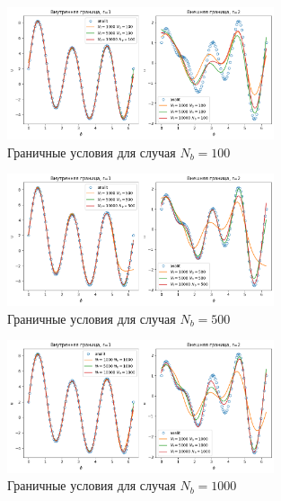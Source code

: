 \documentclass[a4paper,14pt]{extarticle} %
\begin{document}
\begin{figure}[ht]
    \center
    \includegraphics[width=0.7\textwidth]{../plots/termal/bnd l = (20x4) Nf=[1000, 5000, 10000] Nu=100.png}
    \caption{Граничные условия для случая $N_b=100$}
    \label{fig:termal_bnd1}
\end{figure}
\begin{figure}[ht]
    \center
    \includegraphics[width=0.7\textwidth]{../plots/termal/bnd l = (20x4) Nf=[1000, 5000, 10000] Nu=500.png}
    \caption{Граничные условия для случая $N_b=500$}
    \label{fig:termal_bnd2}
\end{figure}
\begin{figure}[ht]
    \center
    \includegraphics[width=0.7\textwidth]{../plots/termal/bnd l = (20x4) Nf=[1000, 5000, 10000] Nu=1000.png}
    \caption{Граничные условия для случая $N_b=1000$}
    \label{fig:termal_bnd3}
\end{figure}
\FloatBarrier

\end{document}
